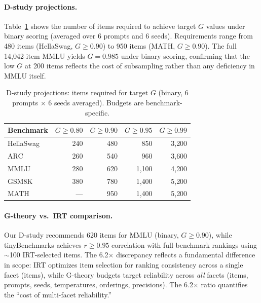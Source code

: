 \documentclass[letterpaper,11pt]{article}
\begin{document}
\paragraph{D-study projections.}
\label{sec:dstudy}
Table~\ref{tab:dstudy} shows the number of items required to achieve target $G$ values under binary scoring (averaged over 6 prompts and 6 seeds).
Requirements range from 480 items (HellaSwag, $G\geq0.90$) to 950 items (MATH, $G\geq0.90$).
The full 14{,}042-item MMLU yields $G = 0.985$ under binary scoring, confirming that the low $G$ at 200 items reflects the cost of subsampling rather than any deficiency in MMLU itself.

\begin{table}[t]
\centering
\caption{D-study projections: items required for target $G$ (binary, 6 prompts $\times$ 6 seeds averaged). Budgets are benchmark-specific.}
\label{tab:dstudy}
\small
\begin{tabular}{@{}l rrrr@{}}
\toprule
Benchmark & $G\!\geq\!0.80$ & $G\!\geq\!0.90$ & $G\!\geq\!0.95$ & $G\!\geq\!0.99$ \\
\midrule
HellaSwag & 240 &  480 &  850  & 3{,}200 \\
ARC       & 260 &  540 &  960  & 3{,}600 \\
MMLU      & 280 &  620 & 1{,}100 & 4{,}200 \\
GSM8K     & 380 &  780 & 1{,}400 & 5{,}200 \\
MATH      &  ---  &  950 & 1{,}400 & 5{,}200 \\
\bottomrule
\end{tabular}
\end{table}

\paragraph{G-theory vs.\ IRT comparison.}
Our D-study recommends 620 items for MMLU (binary, $G\geq0.90$), while tinyBenchmarks \citep{polo2024tinybenchmarks} achieves $r\geq0.95$ correlation with full-benchmark rankings using $\sim$100 IRT-selected items.
The 6.2$\times$ discrepancy reflects a fundamental difference in scope: IRT optimizes item selection for ranking consistency across a single facet (items), while G-theory budgets target reliability across \emph{all} facets (items, prompts, seeds, temperatures, orderings, precisions).
The 6.2$\times$ ratio quantifies the ``cost of multi-facet reliability.''
\end{document}
